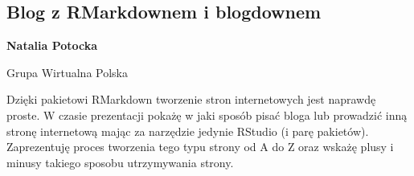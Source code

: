 \documentclass[\main/boa.tex]{subfiles}
\begin{document}
\subsection{Blog z RMarkdownem i blogdownem}

\begin{minipage}{0.915\textwidth}
	\centering
  {\bf {} Natalia Potocka }
\end{minipage}


\begin{affiliations}
\begin{minipage}{0.915\textwidth}
\centering
Grupa Wirtualna Polska \\[-2pt]
\end{minipage}
\end{affiliations}

\vskip 0.3cm

Dzięki pakietowi RMarkdown tworzenie stron internetowych jest naprawdę proste. W czasie prezentacji pokażę w jaki sposób pisać bloga lub prowadzić inną stronę internetową mając za narzędzie jedynie RStudio (i parę pakietów). Zaprezentuję proces tworzenia tego typu strony od A do Z oraz wskażę plusy i minusy takiego sposobu utrzymywania strony. 
\end{document}

